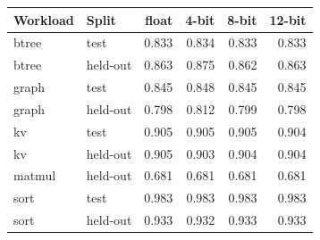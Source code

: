 \begin{tabular}{@{}llrrrr@{}}
\toprule
\textbf{Workload} & \textbf{Split} & \textbf{float} & \textbf{4-bit} & \textbf{8-bit} & \textbf{12-bit} \\
\midrule
btree & test & 0.833 & 0.834 & 0.833 & 0.833 \\
btree & held-out & 0.863 & 0.875 & 0.862 & 0.863 \\
graph & test & 0.845 & 0.848 & 0.845 & 0.845 \\
graph & held-out & 0.798 & 0.812 & 0.799 & 0.798 \\
kv & test & 0.905 & 0.905 & 0.905 & 0.904 \\
kv & held-out & 0.905 & 0.903 & 0.904 & 0.904 \\
matmul & held-out & 0.681 & 0.681 & 0.681 & 0.681 \\
sort & test & 0.983 & 0.983 & 0.983 & 0.983 \\
sort & held-out & 0.933 & 0.932 & 0.933 & 0.933 \\
\bottomrule
\end{tabular}
